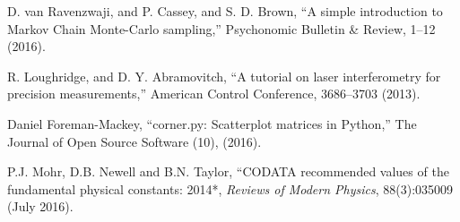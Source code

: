 \documentclass[prb,preprint]{revtex4-1}
\begin{document}
\begin{thebibliography}{99}
 D. van Ravenzwaji, and P. Cassey, and S. D. Brown, ``A simple introduction to Markov Chain Monte-Carlo sampling,'' 
Psychonomic Bulletin {\&} Review, 1--12 (2016).

 R. Loughridge, and D. Y. Abramovitch, ``A tutorial on laser interferometry for precision measurements,'' 
American Control Conference, 3686--3703 (2013).  

 Daniel Foreman-Mackey, ``corner.py: Scatterplot matrices in Python,'' 
The Journal of Open Source Software (10), (2016).  

 P.J. Mohr, D.B. Newell and B.N. Taylor, ``CODATA recommended values of the fundamental physical constants: 2014*, \textit{Reviews of Modern Physics}, 88(3):035009 (July 2016).

\end{thebibliography}
\end{document}
